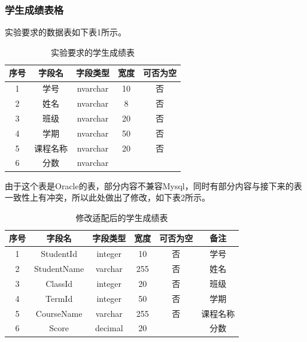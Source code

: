 \documentclass[a4paper,UTF8,heading=false,12pt]{article}
\begin{document}
    \subsubsection{学生成绩表格}

    实验要求的数据表如下表1所示。
    
    \begin{table}[htbp]
        \begin{center}
            \begin{tabular}{@{}ccccc@{}}
            \toprule
            序号 & 字段名  & 字段类型     & 宽度 & 可否为空 \\ \midrule
            1  & 学号   & nvarchar & 10 & 否    \\
            2  & 姓名   & nvarchar & 8  & 否    \\
            3  & 班级   & nvarchar & 20 & 否    \\
            4  & 学期   & nvarchar & 50 & 否    \\
            5  & 课程名称 & nvarchar & 20 & 否    \\
            6  & 分数   & nvarchar &    &      \\ \bottomrule
            \end{tabular}
            \caption{实验要求的学生成绩表}
        \end{center}
    \end{table}

    由于这个表是Oracle的表，部分内容不兼容Mysql，同时有部分内容与接下来的表一致性上有冲突，所以此处做出了修改，如下表2所示。

    \begin{table}[htbp]
        \begin{center}
            \begin{tabular}{@{}cccccc@{}}
                \toprule
                序号 & 字段名         & 字段类型    & 宽度  & 可否为空 & 备注   \\ \midrule
                1  & StudentId   & integer & 10  & 否    & 学号   \\
                2  & StudentName & varchar & 255 & 否    & 姓名   \\
                3  & ClassId     & integer & 20  & 否    & 班级   \\
                4  & TermId      & integer & 50  & 否    & 学期   \\
                5  & CourseName  & varchar & 255 & 否    & 课程名称 \\
                6  & Score       & decimal & 20  &      & 分数   \\ \bottomrule
                \end{tabular}
                \caption{修改适配后的学生成绩表}
        \end{center}
    \end{table}
\end{document}
